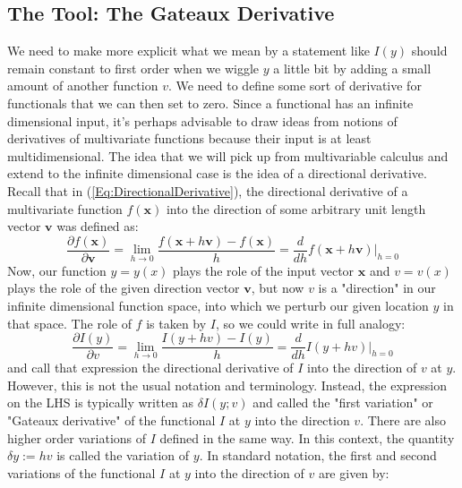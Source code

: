 
\subsection{The Tool: The Gateaux Derivative}
We need to make more explicit what we mean by a statement like $I(y)$ should remain constant to first order when we wiggle $y$ a little bit by adding a small amount of another function $v$. We need to define some sort of derivative for functionals that we can then set to zero. Since a functional has an infinite dimensional input, it's perhaps advisable to draw ideas from notions of derivatives of multivariate functions because their input is at least multidimensional. The idea that we will pick up from multivariable calculus and extend to the infinite dimensional case is the idea of a directional derivative. Recall that in (\ref{Eq:DirectionalDerivative}), the directional derivative of a multivariate function $f(\mathbf{x})$ into the direction of some arbitrary unit length vector $\mathbf{v}$ was defined as:
\begin{equation}
 \frac{\partial f(\mathbf{x}) }{\partial \mathbf{v}} 
 = \lim_{h \rightarrow 0} \frac{f(\mathbf{x} + h \mathbf{v} ) - f(\mathbf{x})}{h}
 = \frac{d}{d h} f(\mathbf{x} + h \mathbf{v}) \bigg\rvert_{h=0}
\end{equation}
Now, our function $y = y(x)$ plays the role of the input vector $\mathbf{x}$ and $v = v(x)$ plays the role of  the given direction vector $\mathbf{v}$, but now $v$ is a "direction" in our infinite dimensional function space, into which we perturb our given location $y$ in that space. The role of $f$ is taken by $I$, so we could write in full analogy:
\begin{equation}
 \frac{\partial I(y) }{\partial v} 
 = \lim_{h \rightarrow 0} \frac{I(y + h v ) - I(y)}{h}
 = \frac{d}{d h} I(y + h v) \bigg\rvert_{h=0}
\end{equation}
and call that expression the directional derivative of $I$ into the direction of $v$ at $y$. However, this is not the usual notation and terminology. Instead, the expression on the LHS is typically written as $\delta I(y;v)$ and called the "first variation" or  "Gateaux derivative" of the functional $I$ at $y$ into the direction $v$. There are also higher order variations of $I$ defined in the same way. In this context, the quantity $\delta y := h v$ is called the variation of $y$.  In standard notation, the first and second variations of the functional $I$ at $y$ into the direction of $v$ are given by:
